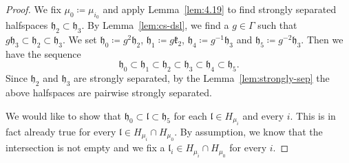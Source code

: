 \begin{proof}
  We fix \(\mu_0\coloneqq \mu_{i_0}\) and apply Lemma~\ref{lem:4.19} to find strongly separated halfspaces \(\mathfrak{h_2} \subset \mathfrak{h_3}\). By Lemma~\ref{lem:cs-dsl}, we find a \(g \in \Gamma\) such that \(g\mathfrak{h}_3 \subset \mathfrak{h}_2 \subset \mathfrak{h}_3\). We set \(\mathfrak{h}_0 \coloneqq g^2 \mathfrak{h}_2\), \(\mathfrak{h}_1 \coloneqq g\mathfrak{k}_2\), \(\mathfrak{h}_4 \coloneqq g^{-1}\mathfrak{h}_3\) and \(\mathfrak{h}_5 \coloneqq g^{-2} \mathfrak{h}_3\). Then we have the sequence
  \[
    \mathfrak{h}_0 \subset \mathfrak{h}_1 \subset \mathfrak{h}_2 \subset \mathfrak{h}_3 \subset \mathfrak{h}_4 \subset \mathfrak{h}_5.
  \]
  Since \(\mathfrak{h}_2\) and \(\mathfrak{h}_3\) are strongly separated, by the Lemma~\ref{lem:strongly-sep} the above halfspaces are pairwise strongly separated.

  We would like to show that \(\mathfrak{h}_0 \subset \mathfrak{l} \subset \mathfrak{h}_5\) for each \(\mathfrak{l} \in H_{\mu_i}\) and every \(i\). This is in fact already true for every \(\mathfrak{l} \in H_{\mu_i} \cap H_{\mu_0}\). By assumption, we know that the intersection is not empty and we fix a \(\mathfrak{l}_i \in H_{\mu_i} \cap H_{\mu_0}\) for every \(i\).


\end{proof}
